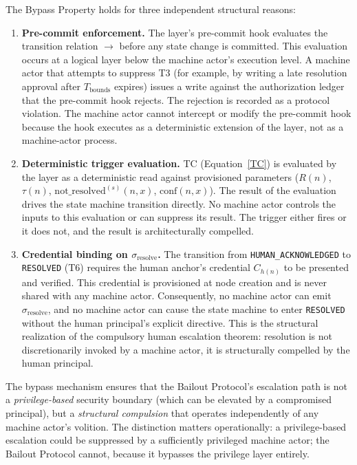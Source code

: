 The Bypass Property holds for three independent structural reasons:

\begin{enumerate}\itemsep=0pt
\item \textbf{Pre-commit enforcement.} The \fact{} layer's pre-commit hook evaluates the transition relation $\rightarrow$ before any state change is committed. This evaluation occurs at a logical layer below the machine actor's execution level. A machine actor that attempts to suppress T3 (for example, by writing a late resolution approval after $T_{\text{bounds}}$ expires) issues a write against the authorization ledger that the pre-commit hook rejects. The rejection is recorded as a protocol violation. The machine actor cannot intercept or modify the pre-commit hook because the hook executes as a deterministic extension of the \fact{} layer, not as a machine-actor process.

\item \textbf{Deterministic trigger evaluation.} TC (Equation~\ref{TC}) is evaluated by the \fact{} layer as a deterministic read against provisioned parameters ($R(n)$, $\tau(n)$, $\text{not\_resolved}^{(s)}(n, x)$, $\text{conf}(n, x)$). The result of the evaluation drives the state machine transition directly. No machine actor controls the inputs to this evaluation or can suppress its result. The trigger either fires or it does not, and the result is architecturally compelled.

\item \textbf{Credential binding on $\sigma_{\text{resolve}}$.} The transition from \texttt{HUMAN\_ACKNOWLEDGED} to \texttt{RESOLVED} (T6) requires the human anchor's credential $C_{h(n)}$ to be presented and verified. This credential is provisioned at node creation and is never shared with any machine actor. Consequently, no machine actor can emit $\sigma_{\text{resolve}}$, and no machine actor can cause the state machine to enter \texttt{RESOLVED} without the human principal's explicit directive. This is the structural realization of the compulsory human escalation theorem: resolution is not discretionarily invoked by a machine actor, it is structurally compelled by the human principal.
\end{enumerate}

The bypass mechanism ensures that the Bailout Protocol's escalation path is not a \emph{privilege-based} security boundary (which can be elevated by a compromised principal), but a \emph{structural compulsion} that operates independently of any machine actor's volition. The distinction matters operationally: a privilege-based escalation could be suppressed by a sufficiently privileged machine actor; the Bailout Protocol cannot, because it bypasses the privilege layer entirely.

